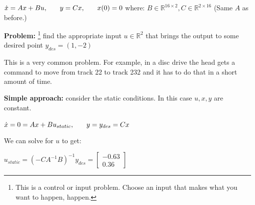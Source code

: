 \documentclass{../tufte-handout}
\begin{document}
\vspace{0.15in}
$\dot x = Ax + Bu, \hspace{0.25in} y = Cx, \hspace{0.25in} x(0) = 0$\newline
where: $B \in \mathbb{R}^{16 \times 2},  C \in \mathbb{R}^{2 \times 16}$  (Same $A$ as before.)
\vspace{0.15in}

\textbf{Problem:} \footnote{This is a control or input problem. Choose an input that makes what you want to happen, happen.} find the appropriate input $u \in \mathbb{R}^{2}$ that brings the output to some desired point $y_{des} = (1, -2)$ 

This is a very common problem. For example, in a disc drive the head gets a command to move from track 22 to track 232 and it has to do that in a short amount of time.

\textbf{Simple approach:} consider the static conditions. In this case $u, x, y$ are constant. \newline 

$\dot x = 0 = Ax + Bu_{static}, \hspace{0.25in} y = y_{des} = Cx$

\vspace{0.25in}

We can solve for $u$ to get: 

$u_{static} = (-CA^{-1}B)^{-1}y_{des} = \begin{bmatrix} -0.63\\ 0.36 \end{bmatrix}$
\end{document}
